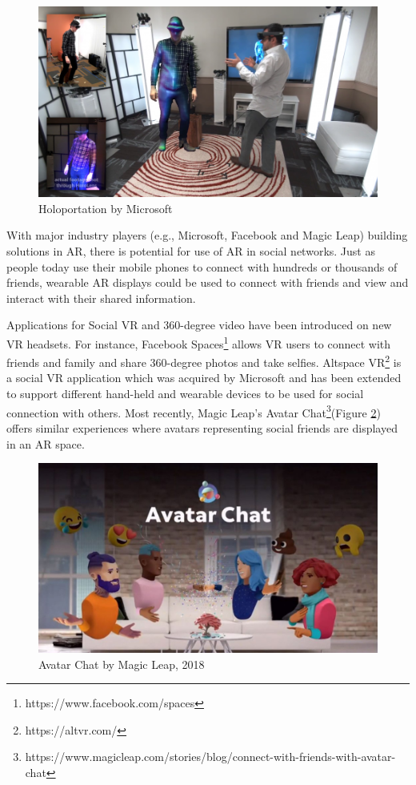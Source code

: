 \begin{figure}
    \centering
    \includegraphics[width=0.8\linewidth]{images/10-intro/holoportation.png}
    \caption{Holoportation by Microsoft \cite{Fanello2016}}
    \label{fig:holoportation}
\end{figure}


With major industry players (e.g., Microsoft, Facebook and Magic Leap) building solutions in AR, there is potential for use of AR in social networks. Just as people today use their mobile phones to connect with hundreds or thousands of friends, wearable AR displays could be used to connect with friends and view and interact with their shared information.

Applications for Social VR and 360-degree video have been introduced on new VR headsets. For instance, Facebook Spaces\footnote{https://www.facebook.com/spaces} allows VR users to connect with friends and family and share 360-degree photos and take selfies. Altspace VR\footnote{https://altvr.com/} is a social VR application which was acquired by Microsoft and has been extended to support different hand-held and wearable devices to be used for social connection with others. Most recently, Magic Leap's Avatar Chat\footnote{https://www.magicleap.com/stories/blog/connect-with-friends-with-avatar-chat}(Figure \ref{fig:ml-avatar-chat-1}) offers similar experiences where avatars representing social friends are displayed in an AR space. 

\begin{figure}
    \centering
    \includegraphics[width=0.8\linewidth]{images/10-intro/magic-leap-avatar-chat.jpg}
    \caption{Avatar Chat by Magic Leap, 2018}
    \label{fig:ml-avatar-chat-1}
\end{figure}

